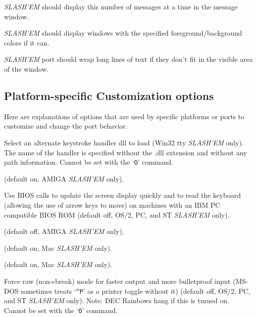 \item[\ib{vary\_msgcount}]
{\it SLASH'EM\/} should display this number of messages at a time in
the message window.

\item[\ib{windowcolors}]
{\it SLASH'EM\/} should display windows with the specified foreground/background
colors if it can.

\item[\ib{wraptext}]
{\it SLASH'EM\/} port should wrap long lines of text if they don't fit in 
the visible area of the window.
\elist
\nd %
\subsection*{Platform-specific Customization options}


Here are explanations of options that are used by specific platforms or ports 
to customize and change the port behavior.
\blist{}

\item[\ib{altkeyhandler}]
Select an alternate keystroke handler dll to load (Win32 tty {\it SLASH'EM\/} only).
The name of the handler is specified without the .dll extension and without any
path information.
Cannot be set with the `{\tt O}' command.

\item[\ib{altmeta}]
(default on, AMIGA {\it SLASH'EM\/} only).

\item[\ib{BIOS}]
Use BIOS calls to update the screen
display quickly and to read the keyboard (allowing the use of arrow
keys to move) on machines with an IBM PC compatible BIOS ROM (default off,
OS/2, PC, and ST {\it SLASH'EM\/} only).

\item[\ib{flush}]
(default off, AMIGA {\it SLASH'EM\/} only).

\item[\ib{MACgraphics}]
(default on, Mac {\it SLASH'EM\/} only).

\item[\ib{page\_wait}]
(default on, Mac {\it SLASH'EM\/} only).

\item[\ib{rawio}]
Force raw (non-cbreak) mode for faster output and more
bulletproof input (MS-DOS sometimes treats `{\tt \^{}P}' as a printer toggle
without it) (default off, OS/2, PC, and ST {\it SLASH'EM\/} only).
Note:  DEC Rainbows hang if this is turned on.
Cannot be set with the `{\tt O}' command.

